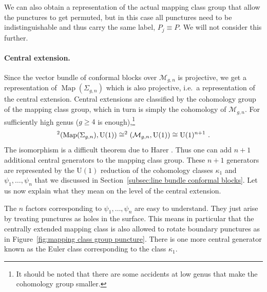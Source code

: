 \documentclass[12pt,a4paper]{article}
\newcommand{\be}{\begin{equation}}
\newcommand{\ee}{\end{equation}}
\let\H\relax
\DeclareMathOperator\H{H}
\DeclareMathOperator\Map{Map}
\begin{document}
We can also obtain a representation of the actual mapping class group that allow the punctures to get permuted, but in this case all punctures need to be indistinguishable and thus carry the same label, $P_j \equiv P$. We will not consider this further.

\paragraph{Central extension.} Since the vector bundle of conformal blocks over $\mathcal{M}_{g,n}$ is projective, we get a representation of $\Map(\Sigma_{g,n})$ which is also projective, i.e.\ a representation of the central extension. Central extensions are classified by the cohomology group of the mapping class group, which in turn is simply the cohomology of $\mathcal{M}_{g,n}$. For sufficiently high genus ($g \ge 4$ is enough),\footnote{It should be noted that there are some accidents at low genus that make the cohomology group smaller.}
\be 
\H^2(\Map(\Sigma_{g,n}),\mathrm{U}(1)) \cong \H^2(\mathcal{M}_{g,n},\mathrm{U}(1)) \cong \mathrm{U}(1)^{n+1}\ .
\ee
The isomorphism is a difficult theorem due to Harer \cite{HarerH2}. Thus one can add $n+1$ additional central generators to the mapping class group. These $n+1$ generators are represented by the $\mathrm{U}(1)$ reduction of the cohomology classes $\kappa_1$ and $\psi_1,\dots,\psi_n$ that we discussed in Section~\ref{subsec:line bundle conformal blocks}. Let us now explain what they mean on the level of the central extension.

The $n$ factors corresponding to $\psi_1,\dots,\psi_n$ are easy to understand. They just arise by treating punctures as holes in the surface. This means in particular that the centrally extended mapping class is also allowed to rotate boundary punctures as in Figure~\ref{fig:mapping class group puncture}. 
There is one more central generator known as the Euler class corresponding to the class $\kappa_1$.
\end{document}
